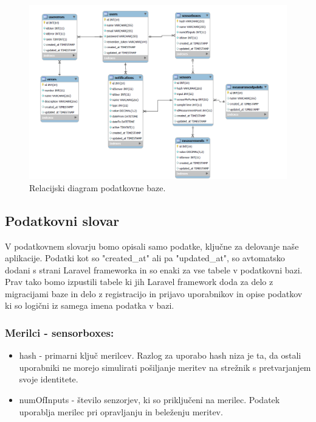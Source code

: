 \documentclass[12pt,a4paper,titlepage,openany]{report}
\begin{document}
\begin{figure}[H]
\begin{center}
\includegraphics[width=1\linewidth]{Slike/RelationDiagram.png}
\end{center}
\caption{Relacijski diagram podatkovne baze.}\label{slika:RelationDiagram}
\end{figure}



\subsection{Podatkovni slovar}
V podatkovnem slovarju bomo opisali samo podatke, ključne za delovanje naše aplikacije. Podatki kot so "created\_at" ali pa "updated\_at", so avtomatsko dodani s strani Laravel frameworka in so enaki za vse tabele v podatkovni bazi. Prav tako bomo izpustili tabele ki jih Laravel framework doda za delo z migracijami baze in delo z registracijo in prijavo uporabnikov in opise podatkov ki so logični iz samega imena podatka v bazi. 

\subsubsection{Merilci - sensorboxes:}
\begin{itemize}
\item hash - primarni ključ merilcev. Razlog za uporabo hash niza je ta, da ostali uporabniki ne morejo simulirati pošiljanje meritev na strežnik s pretvarjanjem svoje identitete.
\item numOfInputs - število senzorjev, ki so priključeni na merilec. Podatek uporablja merilec pri opravljanju in beleženju meritev.
\end{itemize}
\end{document}
